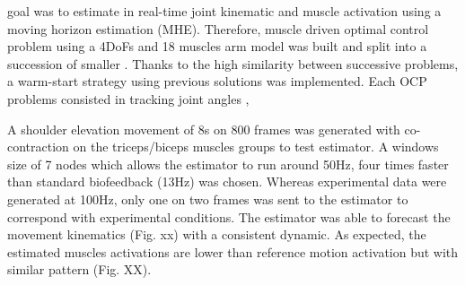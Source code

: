  goal was to estimate in real-time joint kinematic and muscle activation using a moving horizon estimation (MHE). 
Therefore, muscle driven optimal control problem using a 4DoFs and 18 muscles arm model was built and split into a succession of smaller .
Thanks to the high similarity between successive problems, a warm-start strategy using previous solutions was implemented. 
Each OCP problems consisted in tracking joint angles , 

A shoulder elevation movement of 8s on 800 frames was generated with co-contraction on the triceps/biceps muscles groups to test estimator. 
A windows size of 7 nodes which allows the estimator to run around 50Hz, four times faster than standard biofeedback (13Hz) was chosen.
Whereas experimental data were generated at 100Hz, only one on two frames was sent to the estimator to correspond with experimental conditions. 
The estimator was able to forecast the movement kinematics (Fig. xx) with a consistent dynamic. 
As expected, the estimated muscles activations are lower than reference motion activation but with similar pattern (Fig. XX). 

